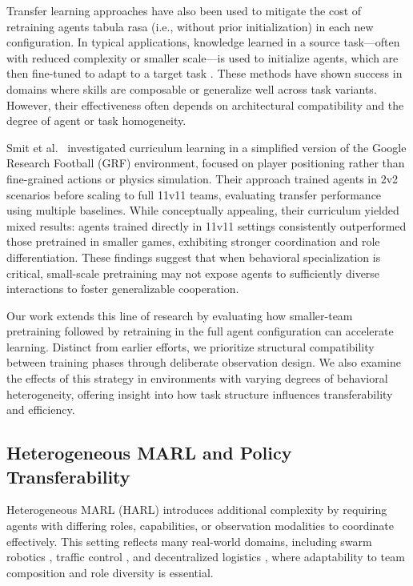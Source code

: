 \documentclass{article}
\begin{document}
Transfer learning approaches have also been used to mitigate the cost of retraining agents 
tabula rasa (i.e., without prior initialization) in each new configuration. 
In typical applications, knowledge learned in a source task—often with reduced 
complexity or smaller scale—is used to initialize agents, 
which are then fine-tuned to adapt to a target task \cite{cui2022}. 
These methods have shown success in domains where skills are composable 
or generalize well across task variants. However, their effectiveness often 
depends on architectural compatibility and the degree of agent or task homogeneity.

Smit et al.\ \cite{smit2023} investigated curriculum learning in a simplified version of the 
Google Research Football (GRF) environment, focused on player positioning rather than 
fine-grained actions or physics simulation. Their approach trained agents in 2v2 scenarios 
before scaling to full 11v11 teams, evaluating transfer performance using multiple baselines. 
While conceptually appealing, their curriculum yielded mixed results: agents trained directly 
in 11v11 settings consistently outperformed those pretrained in smaller games, exhibiting 
stronger coordination and role differentiation. These findings suggest that when behavioral 
specialization is critical, small-scale pretraining may not expose agents to sufficiently 
diverse interactions to foster generalizable cooperation.

Our work extends this line of research by evaluating how smaller-team pretraining followed 
by retraining in the full agent configuration can accelerate learning. 
Distinct from earlier efforts, we prioritize structural compatibility between 
training phases through deliberate observation design. 
We also examine the effects of this strategy in environments with varying degrees of 
behavioral heterogeneity, offering insight into how task structure influences 
transferability and efficiency.

\subsection{Heterogeneous MARL and Policy Transferability}

Heterogeneous MARL (HARL) introduces additional complexity by requiring agents with differing
roles, capabilities, or observation modalities to coordinate effectively. This setting reflects
many real-world domains, including swarm robotics \cite{hoang2023}, traffic control \cite{calvo2018},
and decentralized logistics \cite{rizk2019}, where adaptability to team composition and role diversity
is essential.
\end{document}
